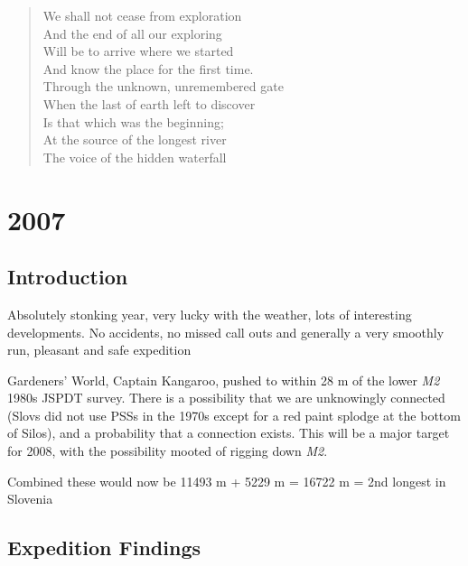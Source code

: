 
\begin{verse}
We shall not cease from exploration  \\
And the end of all our exploring  \\
Will be to arrive where we started  \\
And know the place for the first time. 
 \\
Through the unknown, unremembered gate  \\
When the last of earth left to discover  \\
Is that which was the beginning;  \\
At the source of the longest river  \\
The voice of the hidden waterfall \\
\end{verse}


\hypertarget{section}{%
\chapter{2007}\label{section}}

\hypertarget{introduction}{%
\section{Introduction}\label{introduction}}

Absolutely stonking year, very lucky with the weather, lots of
interesting developments. No accidents, no missed call outs and
generally a very smoothly run, pleasant and safe expedition

Gardeners' World, Captain Kangaroo, pushed to within 28 m of the lower
\emph{M2} 1980s JSPDT survey. There is a possibility that we are
unknowingly connected (Slovs did not use PSSs in the 1970s except for a
red paint splodge at the bottom of Silos), and a probability that a
connection exists. This will be a major target for 2008, with the
possibility mooted of rigging down \emph{M2}.

Combined these would now be 11493 m + 5229 m = 16722 m = 2nd longest in
Slovenia

\hypertarget{expedition-findings}{%
\section{Expedition Findings}\label{expedition-findings}}

